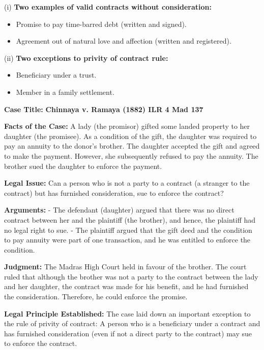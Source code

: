 \documentclass[12pt,a4paper]{book}
\begin{document}
(i) \textbf{Two examples of valid contracts without consideration:}
\begin{itemize}
    \item Promise to pay time-barred debt (written and signed).
    \item Agreement out of natural love and affection (written and registered).
\end{itemize}

(ii) \textbf{Two exceptions to privity of contract rule:}
\begin{itemize}
    \item Beneficiary under a trust.
    \item Member in a family settlement.
\end{itemize}

\vspace{1cm}

\textbf{Case Title:} \textbf{Chinnaya v. Ramaya (1882) ILR 4 Mad 137}

\textbf{Facts of the Case:}  
A lady (the promisor) gifted some landed property to her daughter (the promisee). As a condition of the gift, the daughter was required to pay an annuity to the donor's brother. The daughter accepted the gift and agreed to make the payment. However, she subsequently refused to pay the annuity. The brother sued the daughter to enforce the payment.

\textbf{Legal Issue:}  
Can a person who is not a party to a contract (a stranger to the contract) but has furnished consideration, sue to enforce the contract?

\textbf{Arguments:}  
- The defendant (daughter) argued that there was no direct contract between her and the plaintiff (the brother), and hence, the plaintiff had no legal right to sue.
- The plaintiff argued that the gift deed and the condition to pay annuity were part of one transaction, and he was entitled to enforce the condition.

\textbf{Judgment:}  
The Madras High Court held in favour of the brother. The court ruled that although the brother was not a party to the contract between the lady and her daughter, the contract was made for his benefit, and he had furnished the consideration. Therefore, he could enforce the promise.

\textbf{Legal Principle Established:}  
The case laid down an important exception to the rule of privity of contract: A person who is a beneficiary under a contract and has furnished consideration (even if not a direct party to the contract) may sue to enforce the contract.
\end{document}
